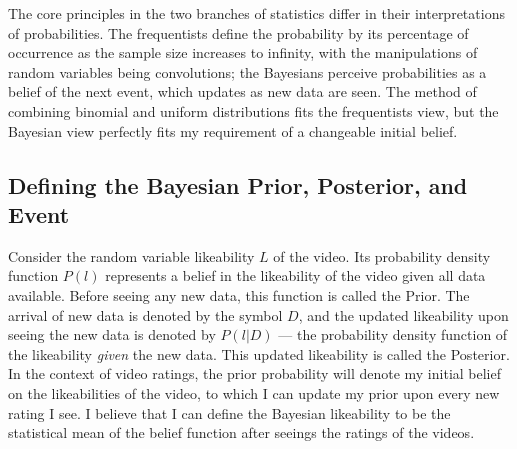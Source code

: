 \documentclass[a4paper,11pt]{article}
\begin{document}
The core principles in the two branches of statistics differ in their interpretations of probabilities. The frequentists define the probability by its percentage of occurrence as the sample size increases to infinity, with the manipulations of random variables being convolutions; the Bayesians perceive probabilities as a belief of the next event, which updates as new data are seen. The method of combining binomial and uniform distributions fits the frequentists view, but the Bayesian view perfectly fits my requirement of a changeable initial belief.

\subsection{Defining the Bayesian Prior, Posterior, and Event}
Consider the random variable likeability $L$ of the video. Its probability density function $P(l)$ represents a belief in the likeability of the video given all data available. Before seeing any new data, this function is called the Prior. The arrival of new data is denoted by the symbol $D$, and the updated likeability upon seeing the new data is denoted by $P(l | D)$ --- the probability density function of the likeability \textit{given} the new data. This updated likeability is called the Posterior. In the context of video ratings, the prior probability will denote my initial belief on the likeabilities of the video, to which I can update my prior upon every new rating I see. I believe that I can define the Bayesian likeability to be the statistical mean of the belief function after seeings the ratings of the videos.



\end{document}
